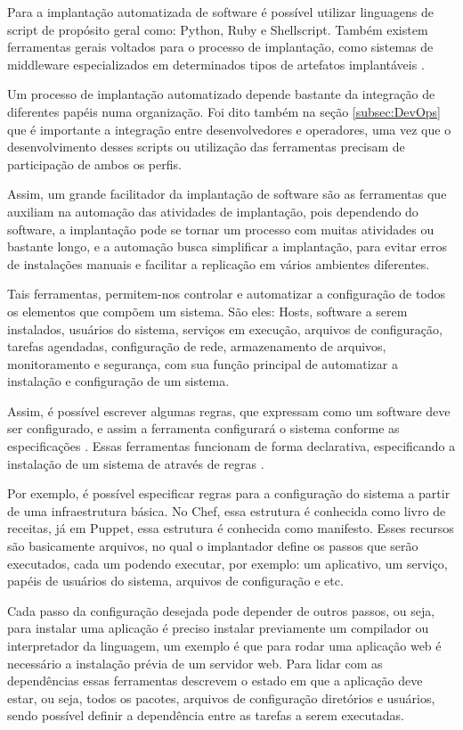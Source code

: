 Para a implantação automatizada de software é
possível utilizar linguagens de script de propósito
geral como: Python, Ruby e Shellscript. Também existem ferramentas gerais 
voltados para o processo de implantação, como sistemas de middleware 
especializados em determinados tipos de artefatos implantáveis \cite{leo2014}.

Um processo de implantação automatizado depende bastante da integração de diferentes papéis
numa organização. Foi dito também na seção \ref{subsec:DevOps} que é importante a
integração entre desenvolvedores e operadores, uma vez que o desenvolvimento desses
scripts ou utilização das ferramentas precisam de participação de ambos os perfis.

Assim, um grande facilitador da implantação de software são as ferramentas que auxiliam na
automação das atividades de implantação, pois dependendo do software, a implantação
pode se tornar um processo com muitas atividades ou bastante longo, e a automação
busca simplificar a implantação, para evitar erros de instalações manuais e 
facilitar a replicação em vários ambientes diferentes.

Tais ferramentas, permitem-nos controlar e automatizar a configuração de todos os 
elementos que compõem um sistema. São eles: Hosts, software a serem instalados,
usuários do sistema, serviços em execução, arquivos de configuração, tarefas agendadas,
configuração de rede, armazenamento de arquivos, monitoramento e segurança, com 
sua função principal de automatizar a instalação e configuração de um 
sistema. 

Assim, é possível escrever algumas regras, que expressam como um software deve 
ser configurado, e assim a ferramenta configurará o sistema conforme as 
especificações \cite{6265084}. Essas ferramentas funcionam de forma declarativa, 
especificando a instalação de um sistema de através de regras \cite{6265084}.

Por exemplo, é possível especificar regras para a configuração do sistema
a partir de uma infraestrutura básica. No Chef, essa estrutura é conhecida como livro
de receitas, já em Puppet, essa estrutura é conhecida como manifesto. Esses recursos
são basicamente arquivos, no qual o implantador define os passos que serão executados,
cada um podendo executar, por exemplo: um aplicativo, um serviço, papéis de usuários do sistema,
arquivos de configuração e etc.

Cada passo da configuração desejada pode depender de outros passos, ou seja, para
instalar uma aplicação é preciso instalar previamente um compilador ou interpretador
 da linguagem, um exemplo é que para rodar uma aplicação web é necessário a 
instalação prévia de um servidor web. Para lidar com as dependências essas 
ferramentas descrevem o estado em que a aplicação deve estar, ou seja, 
todos os pacotes, arquivos de configuração diretórios e usuários, sendo possível 
definir a dependência entre as tarefas a serem executadas.

